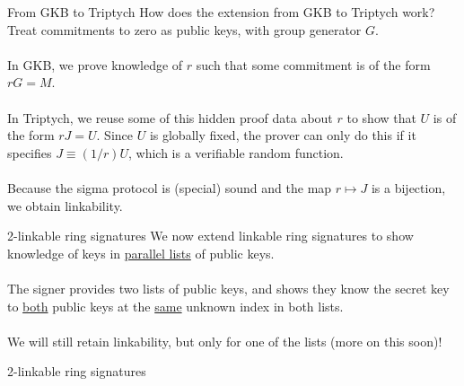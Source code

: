\documentclass[aspectratio=169]{beamer}
\begin{document}
\begin{frame}{From GKB to Triptych}
How does the extension from GKB to Triptych work? Treat commitments to zero as public keys, with group generator $G$.
\\~\\
In GKB, we prove knowledge of $r$ such that some commitment is of the form $rG = M$.
\\~\\
In Triptych, we reuse some of this hidden proof data about $r$ to show that $U$ is of the form $rJ = U$. Since $U$ is globally fixed, the prover can only do this if it specifies $J \equiv (1/r)U$, which is a verifiable random function.
\\~\\
Because the sigma protocol is (special) sound and the map $r \mapsto J$ is a bijection, we obtain linkability.
\end{frame}


\begin{frame}{2-linkable ring signatures}
We now extend linkable ring signatures to show knowledge of keys in \underline{parallel lists} of public keys.
\\~\\
The signer provides two lists of public keys, and shows they know the secret key to \underline{both} public keys at the \underline{same} unknown index in both lists.
\\~\\
We will still retain linkability, but only for one of the lists (more on this soon)!
\end{frame}


\begin{frame}{2-linkable ring signatures}
\begin{center}
\end{center}
\end{frame}
\end{document}
